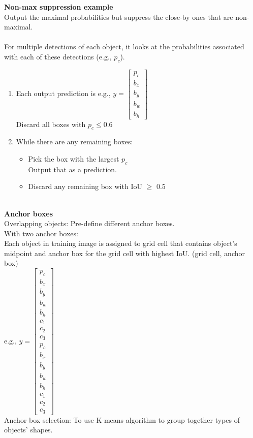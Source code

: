 \textbf{Non-max suppression example}\\
Output the maximal probabilities but suppress the close-by ones that are non-maximal.\\
\\
For multiple detections of each object, it looks at the probabilities associated with each of these detections (e.g., $p_c$).\begin{enumerate}
\item
Each output prediction is e.g., $y = \begin{bmatrix} p_c \\ b_x\\ b_y\\ b_w\\ b_h \end{bmatrix}$\\
Discard all boxes with $p_c \le 0.6$
\item
While there are any remaining boxes:
\begin{itemize}
\item
Pick the box with the largest $p_c$\\
Output that as a prediction.
\item
Discard any remaining box with IoU $\ge$ 0.5
\end{itemize}
\end{enumerate}
~\\
\textbf{Anchor boxes}\\
Overlapping objects: Pre-define different anchor boxes.\\
With two anchor boxes:\\
Each object in training image is assigned to grid cell that contains object's midpoint and anchor box for the grid cell with highest IoU. (grid cell, anchor box)\\
e.g., $y = {\begin{bmatrix} p_c \\ b_x \\ b_y \\ b_w \\ b_h \\ c_1 \\ c_2 \\ c_3 \\ p_c \\ b_x \\ b_y \\ b_w \\ b_h \\ c_1 \\ c_2 \\ c_3 \end{bmatrix}}$\\
Anchor box selection: To use K-means algorithm to group together types of objects' shapes.

